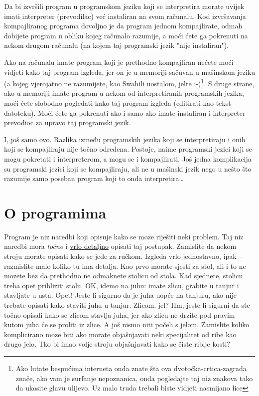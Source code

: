 	Da bi izvršili program u programskom jeziku koji se interpretira morate uvijek
	imati interpreter (prevodilac) već instaliran na svom računalu. Kod
	izvršavanja kompajliranog programa dovoljno je da program jednom kompajlirate,
	odmah dobijete program u obliku kojeg računalo razumije, a moći ćete ga
	pokrenuti na nekom drugom računalu (na kojem taj programski jezik "nije
	instaliran"). 

	Ako na računalu imate program koji je prethodno kompajliran nećete moći
	vidjeti kako taj program izgleda, jer on je u memoriji sačuvan u mašinskom
	jeziku (a kojeg vjerojatno ne razumijete, kao Swahili uostalom, jelte 
	:-)\footnote{Ako lutate bespućima interneta onda znate šta ova
	dvotočka-crtica-zagrada znače, ako vam je surfanje nepoznanica, onda
	pogledajte taj niz znakova tako da ukosite glavu ulijevo. Uz malo truda trebali
	biste vidjeti nasmijano lice}. 
	S druge
	strane, ako u memoriji imate program u nekom od interpretiranih programskih jezika,
	moći ćete slobodno pogledati kako taj program izgleda (editirati kao tekst
	datoteku). Moći ćete ga pokrenuti ako i samo ako imate instaliran i
	interpreter-prevodioc za upravo taj programski jezik.

	I, još samo ovo. Razlika između programskih jezika koji se interpretiraju
	i onih koji se kompajliraju nije točno određena. Postoje, naime programski
	jezici koji se mogu pokretati i interpreterom, a mogu se i kompajlirati. Još
	jedna komplikacija su programski jezici koji se kompajliraju, ali ne u mašinski
	jezik nego u nešto što razumije samo poseban program koji to onda
	interpretira\dots 

\section{O programima}
	
	Program je niz naredbi koji opisuje kako se moze riješiti neki problem. Taj
	niz naredbi mora \emph{točno} i \underline{vrlo detaljno} opisati taj
	postupak. Zamislite da nekom stroju morate opisati kako se jede za ručkom.
	Izgleda vrlo jednostavno, ipak -- razmislite malo koliko tu ima detalja. Kao prvo
	morate sjesti za stol, ali i to ne mozete bez da prethodno ne odmaknete stolicu
	od stola. Kad sjednete, stolicu treba opet pribliziti stolu. OK, idemo na juhu:
	imate zlicu, grabite u tanjur i stavljate u usta. Opet! Jeste li sigurno da je
	juha uopće na tanjuru, ako nije trebate opisati kako staviti juhu u tanjur.
	Zlicom, jel? Hm, jeste li sigurni da ste točno opisali kako se zlicom
	stavlja juha, jer ako zlicu ne drzite pod pravim kutom juha će
	se proliti iz zlice. A još nismo niti počeli s jelom. Zamislite
	koliko komplicirano moze biti ako morate objašnjavati neki specijalitet od
	ribe kao drugo jelo.
	Tko bi imao volje stroju objašnjavati kako se
	čiste riblje kosti?

